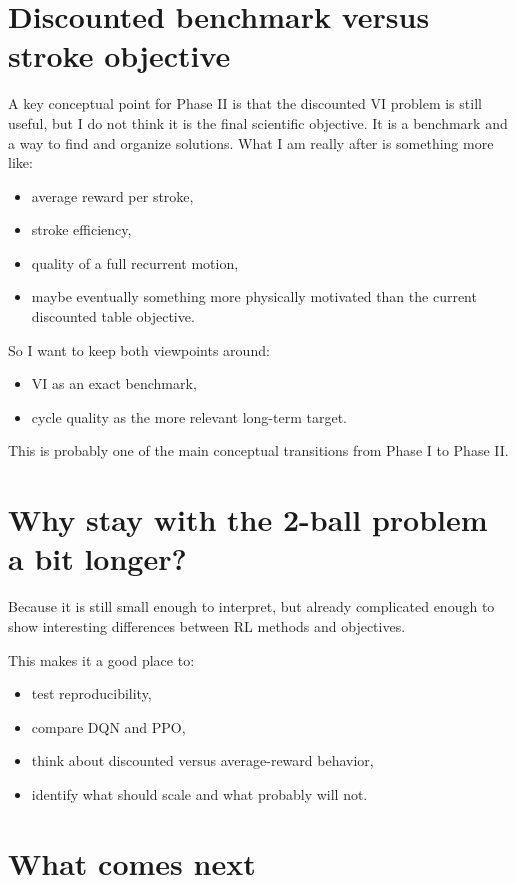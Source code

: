 \documentclass{article}
\begin{document}
\section{Discounted benchmark versus stroke objective}

A key conceptual point for Phase II is that the discounted VI problem is still useful, but I do not think it is the final scientific objective. It is a benchmark and a way to find and organize solutions. What I am really after is something more like:
\begin{itemize}
    \item average reward per stroke,
    \item stroke efficiency,
    \item quality of a full recurrent motion,
    \item maybe eventually something more physically motivated than the current discounted table objective.
\end{itemize}

So I want to keep both viewpoints around:
\begin{itemize}
    \item VI as an exact benchmark,
    \item cycle quality as the more relevant long-term target.
\end{itemize}

This is probably one of the main conceptual transitions from Phase I to Phase II.

\section{Why stay with the 2-ball problem a bit longer?}

Because it is still small enough to interpret, but already complicated enough to show interesting differences between RL methods and objectives.

This makes it a good place to:
\begin{itemize}
    \item test reproducibility,
    \item compare DQN and PPO,
    \item think about discounted versus average-reward behavior,
    \item identify what should scale and what probably will not.
\end{itemize}

\section{What comes next}
\end{document}
